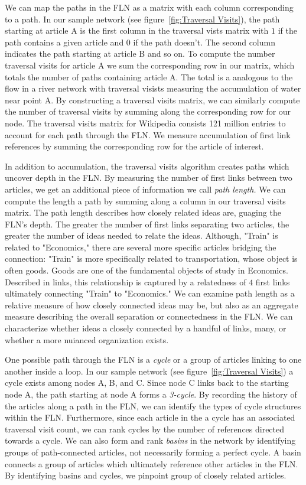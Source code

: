 \documentclass[pre,twocolumn,twoside,superscriptaddress,floatfix, aps, 10pt]{revtex4-1}
\begin{document}
We can map the paths in the FLN as a matrix with each column corresponding to a path. In our sample network 
(see figure~\ref{fig:Traversal Visits}), the path starting at article A is the 
first column in the traversal vists matrix with $1$ if the path contains a given article and 
$0$ if the path doesn't. The second column indicates the path starting at article B and so on. 
To compute the number traversal visits for article A we sum the corresponding row in our matrix,
which totals the number of paths containing article A. The total is a analogous to the flow 
in a river network with traversal visists measuring the accumulation of water near point A. 
By constructing a traversal visits matrix, we can similarly compute the number of traversal 
visits by summing along the corresponding row for our node. The traversal visits matrix for 
Wikipedia consists 121 million entries to account for each path through the FLN. 
We measure accumulation of first link references by summing the corresponding row for the 
article of interest.

In addition to accumulation, the traversal visits algorithm creates paths 
which uncover depth in the FLN. By measuring the number of first links between
two articles, we get an additional piece of information we call 
{\it path length.} We can compute the length a path by summing 
along a column in our traversal visits matrix. The path length describes how closely related ideas are, guaging the FLN's depth. The greater the number of first links separating two articles, the greater the number of ideas needed to relate the ideas. Although, 
"Train" is related to "Economics," there are several more specific articles
bridging the connection:
"Train" is more specifically related to transportation, whose object
is often goods. Goods are one of the fundamental objects of study in Economics.
Described in links, this relationship is captured by a relatedness of $4$ 
first links ultimately connecting "Train" to "Economics." 
We can examine path length as a relative measure of how closely connected ideas
may be, but also as an aggregate measure describing the overall separation or 
connectedness in the FLN.
We can characterize whether ideas a closely connected by a handful of links, 
many, or whether a more nuianced organization exists. 


One possible path through the FLN is a {\it cycle} or a group of articles 
linking to one another inside a loop. In our sample network 
(see figure~\ref{fig:Traversal Visits}) 
a cycle exists among nodes A, B, and C. Since node C links back to the starting node A, the path starting at node A forms a {\it 3-cycle}. 
By recording the history of the articles along a path in the FLN, we can identify
the types of cycle structures within the FLN. Furthermore, since each article 
in the a cycle has an associated traversal visit count, we can rank cycles by 
the number of references directed towards a cycle. 
We can also form and rank {\it basins} in the network by identifying groups of 
path-connected articles, not necessarily forming a perfect cycle.
A basin connects a group of articles which ultimately reference other articles
in the FLN. By identifying basins and cycles, we pinpoint group of closely related articles.
\end{document}
